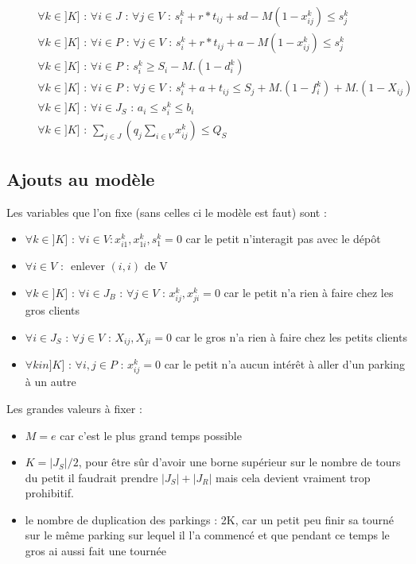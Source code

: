 \documentclass[12pt,a4paper,fleqn]{article}
\begin{document}
\begin{align}
& && \forall k \in ]K] \text{ : } \forall i \in J \text{ : } \forall j \in V \text{ : } s_i^k + r*t_{ij} + sd - M(1-x_{ij}^k) \leqslant s_j^k \label{sequentialitepetit1} \\
& && \forall k \in ]K] \text{ : } \forall i \in P \text{ : } \forall j \in V \text{ : } s_i^k + r*t_{ij} + a - M(1-x_{ij}^k) \leqslant s_j^k \label{sequentialitepetit2} \\
& && \forall k \in ]K] \text{ : } \forall i \in P \text{ : } s_i^k \geqslant S_i - M.(1 - d_i^k) \label{datedebutpetit} \\
& && \forall k \in ]K] \text{ : } \forall i \in P \text{ : } \forall j \in V \text{ : } s_i^k + a + t_{ij} \leqslant S_j + M.(1 - f^k_i) + M.(1 - X_{ij}) \label{datedefinpetit} \\
& && \forall k \in ]K] \text{ : } \forall i \in J_S \text{ : } a_i \leqslant s_i^k \leqslant b_i \label{fenetrepetit} \\
& && \forall k \in ]K] \text{ : } \sum \limits_{j \in J} (q_j \sum \limits_{i \in V} x^k_{ij}) \leqslant Q_S \label{capa}
\end{align}

\subsection{Ajouts au modèle}

Les variables que l'on fixe (sans celles ci le modèle est faut) sont :
\begin{itemize}
\item $\forall k \in ]K] \text{ : } \forall i \in V : x^k_{i1}, x^k_{1i}, s^k_1 = 0$ car le petit n'interagit pas avec le dépôt
\item $\forall i \in V \text{ : }$ enlever $(i,i)$ de V
\item $\forall k \in ]K] \text{ : } \forall i \in J_B \text{ : } \forall j \in V \text{ : } x^k_{ij}, x^k_{ji} = 0$ car le petit n'a rien à faire chez les gros clients
\item $\forall i \in J_S \text{ : } \forall j \in V \text{ : } X_{ij}, X_{ji} = 0$ car le gros n'a rien à faire chez les petits clients
\item $\forall k in ]K] \text{ : } \forall i,j \in P \text{ : } x_{ij}^k = 0$ car le petit n'a aucun intérêt à aller d'un parking à un autre
\end{itemize}

Les grandes valeurs à fixer :
\begin{itemize}
\item $M = e$ car c'est le plus grand temps possible
\item $K = |J_S|/2$, pour être sûr d'avoir une borne supérieur sur le nombre de tours du petit il faudrait prendre $|J_S| + |J_R|$ mais cela devient vraiment trop prohibitif.
\item le nombre de duplication des parkings : 2K, car un petit peu finir sa tourné sur le même parking sur lequel il l'a commencé et que pendant ce temps le gros ai aussi fait une tournée
\end{itemize}
\end{document}
